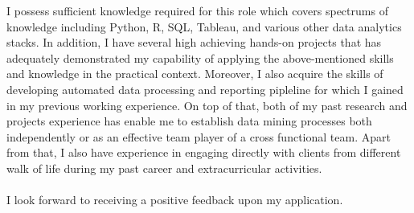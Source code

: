 \documentclass[11pt, a4paper]{awesome-cv}
\begin{document}
\begin{cvletter}
I possess sufficient knowledge required for this role which covers spectrums of knowledge including Python, R, SQL, Tableau, and various other data analytics stacks. In addition, I have several high achieving hands-on projects that has adequately demonstrated my capability of applying the above-mentioned skills and knowledge in the practical context. Moreover, I also acquire the skills of developing automated data processing and reporting pipleline for which I gained in my previous working experience. On top of that, both of my past research and projects experience has enable me to establish data mining processes both independently or as an effective team player of a cross functional team. Apart from that, I also have experience in engaging directly with clients from different walk of life during my past career and extracurricular activities.\\\\
I look forward to receiving a positive feedback upon my application.
\end{cvletter}


\makeletterclosing
\end{document}
